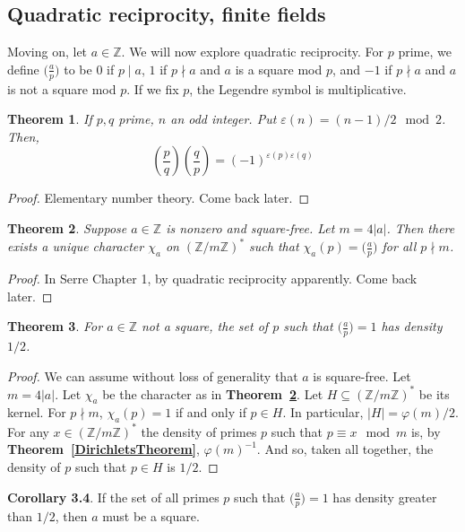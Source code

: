 \documentclass[12pt]{article}
\newcommand{\ints}{\mathbb{Z}}
\newcommand{\intsmod}[1]{\ints / #1 \ints}
\newcommand{\tref}[1]{\textbf{Theorem~\ref{#1}}}
\newtheorem{thm}{Theorem}
\numberwithin{equation}{section}
\numberwithin{thm}{section}
\numberwithin{lemma}{section}
\numberwithin{cor}{section}
\begin{document}
\subsection{Quadratic reciprocity, finite fields}

Moving on, let $a \in \ints$. We will now explore quadratic reciprocity. For $p$ prime, we define $\big(\frac{a}{p}\big)$ to be $0$ if $p \mid a$, $1$ if $p \nmid a$ and $a$ is a square mod $p$, and $-1$ if $p \nmid a$ and $a$ is not a square mod $p$. If we fix $p$, the Legendre symbol is multiplicative.

\begin{thm}\label{QuadraticReciprocity}
  If $p, q$ prime, $n$ an odd integer. Put $\varepsilon(n) = (n-1)/2 \mod 2$. Then, \begin{equation*}
    \left( \frac{p}{q} \right) \left( \frac{q}{p} \right) = (-1)^{\varepsilon(p) \varepsilon(q)}
  \end{equation*}
\end{thm}
\begin{proof}
  Elementary number theory. Come back later.
\end{proof}

\begin{thm}\label{CharacterExtensionOfLegendreSymbol}
  Suppose $a \in \ints$ is nonzero and square-free. Let $m = 4 |a|$. Then there exists a unique character $\chi_a$ on $(\intsmod{m})^*$ such that $\chi_a(p) = \big(\frac{a}{p}\big)$ for all $p \nmid m$.
\end{thm}
\begin{proof}
  In Serre Chapter 1, by quadratic reciprocity apparently. Come back later.
\end{proof}

\begin{thm}\label{PrimeSquaresHaveHalfDensity}
  For $a \in \ints$ not a square, the set of $p$ such that $\big(\frac{a}{p} \big) = 1$ has density $1/2$.
\end{thm}
\begin{proof}
  We can assume without loss of generality that $a$ is square-free. Let $m = 4 |a|$. Let $\chi_a$ be the character as in \tref{CharacterExtensionOfLegendreSymbol}. Let $H \subseteq (\intsmod{m})^*$ be its kernel. For $p \nmid m$, $\chi_a(p) = 1$ if and only if $p \in H$. In particular, $|H| = \varphi(m)/2$. For any $x \in (\intsmod{m})^*$ the density of primes $p$ such that $p \equiv x \mod m$ is, by \tref{DirichletsTheorem}, $\varphi(m)^{-1}$. And so, taken all together, the density of $p$ such that $p \in H$ is $1/2$.
\end{proof}

\textbf{Corollary 3.4}. If the set of all primes $p$ such that $\big( \frac{a}{p} \big) = 1$ has density greater than $1/2$, then $a$ must be a square.
\end{document}
